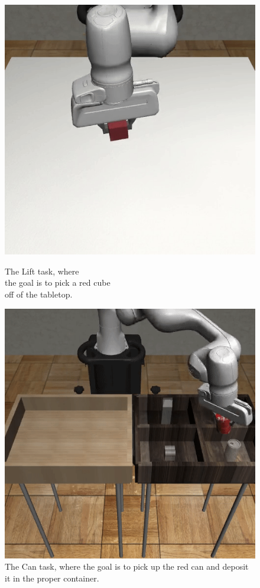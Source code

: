 \begin{figure}
\centering
\begin{minipage}{.24\textwidth}
  \centering

\includegraphics[width=.95\linewidth]{figs/task_lift.png}
    \centering
   \caption{The Lift task, where \\the goal is to pick a red cube \\off of the tabletop.}
  \label{fig:task_lift}
\end{minipage}%
    \centering
\begin{minipage}{.24\textwidth}

\includegraphics[width=.95\linewidth]{figs/task_can.png}
  \centering
  \caption{The Can task, where the goal is to pick up the red can and deposit it in the proper container.}
  \label{fig:task_can}
\end{minipage}
\end{figure}



